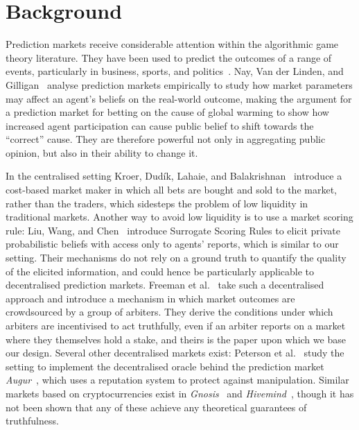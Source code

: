 \documentclass[10pt,a4paper]{article}
\theoremstyle{plain}
\theoremstyle{definition}
\begin{document}
\section{Background}

\label{sec:background}

Prediction markets receive considerable attention within the algorithmic game
theory literature. They have been used to predict the outcomes of a range of
events, particularly in business, sports, and politics~\cite{Spann2003,
Berg2006}. Nay, Van der Linden, and Gilligan~\cite{Nay2016} analyse prediction
markets empirically to study how market parameters may affect an agent's
beliefs on the real-world outcome, making the argument for a prediction market
for betting on the cause of global warming to show how increased agent
participation can cause public belief to shift towards the ``correct'' cause.
They are therefore powerful not only in aggregating public opinion, but also in
their ability to change it.

In the centralised setting Kroer, Dud\'ik, Lahaie, and
Balakrishnan~\cite{Kroer2016} introduce a cost-based market maker in which all
bets are bought and sold to the market, rather than the traders, which
sidesteps the problem of low liquidity in traditional markets. Another way to
avoid low liquidity is to use a market scoring rule: Liu, Wang, and
Chen~\cite{Liu2020} introduce Surrogate Scoring Rules to elicit private
probabilistic beliefs with access only to agents' reports, which is similar to
our setting. Their mechanisms do not rely on a ground truth to quantify the
quality of the elicited information, and could hence be particularly applicable
to decentralised prediction markets. Freeman et al.~\cite{CODiPM} take such a
decentralised approach and introduce a mechanism in which market outcomes are
crowdsourced by a group of arbiters. They derive the conditions under which
arbiters are incentivised to act truthfully, even if an arbiter reports on a
market where they themselves hold a stake, and theirs is the paper upon which
we base our design. Several other decentralised markets exist: Peterson et
al.~\cite{Peterson2015} study the setting to implement the decentralised oracle
behind the prediction market \emph{Augur}~\cite{Augur}, which uses a reputation
system to protect against manipulation. Similar markets based on
cryptocurrencies exist in \emph{Gnosis}~\cite{Gnosis} and
\emph{Hivemind}~\cite{Hivemind}, though it has not been shown that any of these
achieve any theoretical guarantees of truthfulness.
\end{document}
